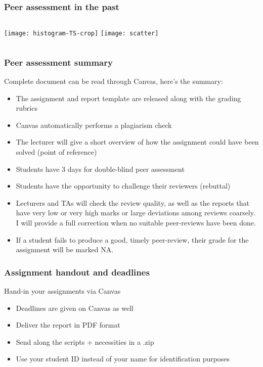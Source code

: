 \begin{frame}
  \frametitle{Peer assessment in the past}
  \begin{columns}
    \centering
      \texttt{[image: histogram-TS-crop]}
    \centering
      \texttt{[image: scatter]}   
  \end{columns}
 \end{frame}

 \begin{frame}
  \frametitle{Peer assessment summary}
  Complete document can be read through Canvas, here's the summary:
  \begin{itemize}
    \item The assignment and report template are released along with the grading rubrics
    \item Canvas automatically performs a plagiarism check
    \item The lecturer will give a short overview of how the assignment could have been solved (point of reference)
    \item Students have 3 days for double-blind peer assessment
    \item Students have the opportunity to challenge their reviewers (rebuttal)
    \item Lecturers and TAs will check the review quality, as well as the reports that have very low or very high marks or large deviations among reviews coarsely. I will provide a full correction when no suitable peer-reviews have been done.
    \item If a student fails to produce a good, timely peer-review, their grade for the assignment will be marked NA.
  \end{itemize}
 \end{frame}
%
\begin{frame}
 \frametitle{Assignment handout and deadlines}
     Hand-in your assignments via Canvas
    \begin{itemize}
      \item Deadlines are given on Canvas as well
      \item Deliver the report in PDF format
      \item Send along the scripts + necessities in a .zip
      \item Use your student ID instead of your name for identification purposes
    \end{itemize}
\end{frame}


